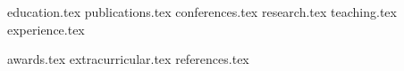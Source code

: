 \documentclass[letterpaper,11pt]{article}
\begin{document}

{education.tex}
{publications.tex}
{conferences.tex}
{research.tex}
{teaching.tex}
{experience.tex}

{awards.tex}
{extracurricular.tex}
{references.tex}
\end{document}
